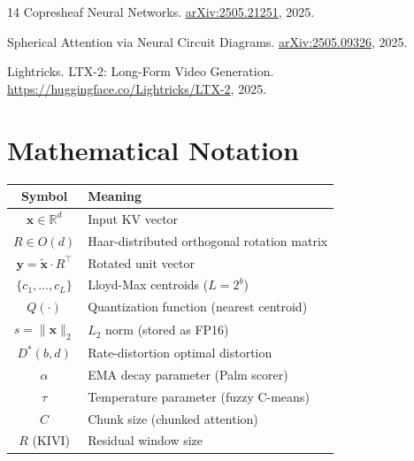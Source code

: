 \documentclass[11pt,a4paper]{article}
\begin{document}
\begin{thebibliography}{14}
Copresheaf Neural Networks.
\newblock \href{https://arxiv.org/abs/2505.21251}{arXiv:2505.21251}, 2025.

Spherical Attention via Neural Circuit Diagrams.
\newblock \href{https://arxiv.org/abs/2505.09326}{arXiv:2505.09326}, 2025.

Lightricks.
\newblock LTX-2: Long-Form Video Generation.
\newblock \url{https://huggingface.co/Lightricks/LTX-2}, 2025.

\end{thebibliography}

\appendix

\section{Mathematical Notation}\label{app:notation}

\begin{table}[h]
\centering
\begin{tabular}{cl}
\toprule
\textbf{Symbol} & \textbf{Meaning} \\
\midrule
$\mathbf{x} \in \mathbb{R}^d$        & Input KV vector \\
$R \in O(d)$                          & Haar-distributed orthogonal rotation matrix \\
$\mathbf{y} = \tilde{\mathbf{x}} \cdot R^\top$ & Rotated unit vector \\
$\{c_1, \ldots, c_L\}$               & Lloyd-Max centroids ($L = 2^b$) \\
$Q(\cdot)$                            & Quantization function (nearest centroid) \\
$s = \|\mathbf{x}\|_2$               & $L_2$ norm (stored as FP16) \\
$D^*(b, d)$                           & Rate-distortion optimal distortion \\
$\alpha$                              & EMA decay parameter (Palm scorer) \\
$\tau$                                & Temperature parameter (fuzzy C-means) \\
$C$                                   & Chunk size (chunked attention) \\
$R$ (KIVI)                            & Residual window size \\
\bottomrule
\end{tabular}
\end{table}
\end{document}
